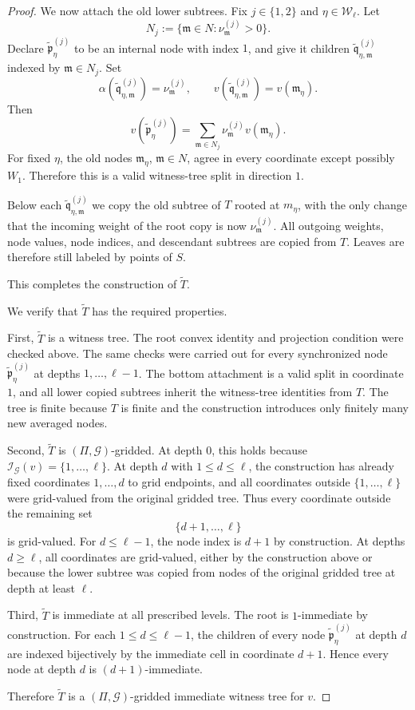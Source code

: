 \documentclass[10pt]{amsart}
\theoremstyle{plain}
\theoremstyle{definition}
\providecommand{\cG}[0]{\ensuremath{\mathcal G}\xspace}
\providecommand{\cI}[0]{\ensuremath{\mathcal I}\xspace}
\let\leq\leqslant
\let\geq\geqslant
\newcommand{\fm}{\mathfrak{m}}
\newcommand{\fp}{\mathfrak{p}}
\newcommand{\fq}{\mathfrak{q}}
\begin{document}
\begin{proof}
We now attach the old lower subtrees. Fix $j\in\{1,2\}$ and
$\eta\in\mathcal W_\ell$.  Let
\[
  N_j:=\{\fm\in N:\nu_\fm^{(j)}>0\}.
\]
Declare $\widetilde{\fp}^{(j)}_\eta$ to be an internal node with index $1$, and give
it children $\widetilde{\fq}^{(j)}_{\eta,\fm}$ indexed by $\fm\in N_j$.  Set
\[
  \alpha(\widetilde{\fq}^{(j)}_{\eta,\fm})=\nu_\fm^{(j)},\qquad
  v(\widetilde{\fq}^{(j)}_{\eta,\fm})=v(\fm_\eta).
\]
Then
\[
  v(\widetilde{\fp}^{(j)}_\eta)
  =
  \sum_{\fm\in N_j}\nu_\fm^{(j)}v(\fm_\eta).
\]
For fixed $\eta$, the old nodes $\fm_\eta$, $\fm\in N$, agree in every
coordinate except possibly $W_1$.  Therefore this is a valid
witness-tree split in direction $1$.

Below each $\widetilde{\fq}^{(j)}_{\eta,\fm}$ we copy the old subtree of $T$ rooted
at $m_\eta$, with the only change that the incoming weight of the root
copy is now $\nu_\fm^{(j)}$. All outgoing weights, node values, node
indices, and descendant subtrees are copied from $T$. Leaves are
therefore still labeled by points of $S$.

This completes the construction of $\widetilde T$.

We verify that $\widetilde T$ has the required properties.

First, $\widetilde T$ is a witness tree. The root convex identity and
projection condition were checked above.  The same checks were carried
out for every synchronized node $\widetilde{\fp}^{(j)}_\eta$ at depths
$1,\ldots,\ell-1$.  The bottom attachment is a valid split in
coordinate $1$, and all lower copied subtrees inherit the witness-tree
identities from $T$.  The tree is finite because $T$ is finite and the
construction introduces only finitely many new averaged nodes.

Second, $\widetilde T$ is $(\Pi,\cG)$-gridded.  At depth $0$, this
holds because $\cI_\cG(v)=\{1,\ldots,\ell\}$.  At depth $d$ with
$1\leq d\leq \ell$, the construction has already fixed coordinates
$1,\ldots,d$ to grid endpoints, and all coordinates outside
$\{1,\ldots,\ell\}$ were grid-valued from the original gridded tree.
Thus every coordinate outside the remaining set
\[
  \{d+1,\ldots,\ell\}
\]
is grid-valued. For $d\leq \ell-1$, the node index is $d+1$ by
construction. At depths $d\geq \ell$, all coordinates are
grid-valued, either by the construction above or because the lower
subtree was copied from nodes of the original gridded tree at depth at
least $\ell$.

Third, $\widetilde T$ is immediate at all prescribed levels. The root
is $1$-immediate by construction.  For each $1\leq d\leq \ell-1$, the
children of every node $\widetilde{\fp}^{(j)}_\eta$ at depth $d$ are indexed
bijectively by the immediate cell in coordinate $d+1$.  Hence every
node at depth $d$ is $(d+1)$-immediate.

Therefore $\widetilde T$ is a $(\Pi,\cG)$-gridded immediate witness
tree for $v$.
\end{proof}
\end{document}
